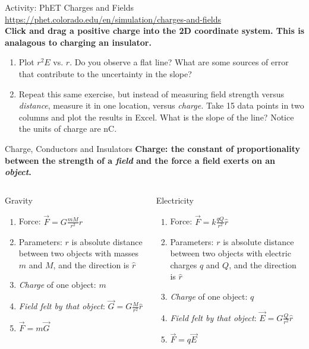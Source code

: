 \documentclass{beamer}
\begin{document}
\begin{frame}{Activity: PhET Charges and Fields}
\small
\url{https://phet.colorado.edu/en/simulation/charges-and-fields} \\ \vspace{0.2cm}
\textbf{Click and drag a positive charge into the 2D coordinate system.  This is analagous to charging an insulator.}
\begin{enumerate}
\item Plot $r^2 E$ vs. $r$.  Do you observe a flat line?  What are some sources of error that contribute to the uncertainty in the slope?
\item Repeat this same exercise, but instead of measuring field strength versus \textit{distance}, measure it in one location, versus \textit{charge.} Take 15 data points in two columns and plot the results in Excel.  What is the slope of the line?  Notice the units of charge are nC.
\end{enumerate}
\end{frame}

\begin{frame}{Charge, Conductors and Insulators}
\centering
\textbf{\alert{Charge: the constant of proportionality between the strength of a \textit{field} and the force a field exerts on an \textit{object}.}} \\
\hrulefill
\small
\begin{columns}[T]
\begin{column}{0.5\textwidth}
\alert{Gravity}
\begin{enumerate}
\item Force: $\vec{F} = G \frac{m M}{r^2} \hat{r}$
\item Parameters: $r$ is absolute distance between two objects with masses $m$ and $M$, and the direction is $\hat{r}$
\item \textit{Charge} of one object: $m$
\item \textit{Field felt by that object}: $\vec{G} = G \frac{M}{r^2} \hat{r}$
\item $\vec{F} = m \vec{G}$
\end{enumerate}
\end{column}
\begin{column}{0.5\textwidth}
\alert{Electricity}
\begin{enumerate}
\item Force: $\vec{F} = k \frac{q Q}{r^2} \hat{r}$
\item Parameters: $r$ is absolute distance between two objects with electric charges $q$ and $Q$, and the direction is $\hat{r}$
\item \textit{Charge} of one object: $q$
\item \textit{Field felt by that object}: $\vec{E} = G \frac{Q}{r^2} \hat{r}$
\item $\vec{F} = q \vec{E}$
\end{enumerate}
\end{column}
\end{columns}
\end{frame}
\end{document}
